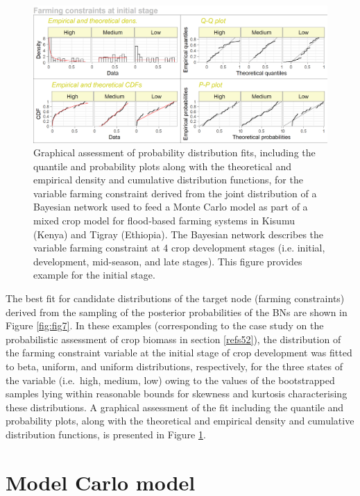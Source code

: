 \documentclass[]{elsarticle} %
\begin{document}
\begin{figure}[!h]

{\centering \includegraphics[width=1\linewidth,]{figures/Local_constraints_at_initial_stage_fitted_distribution} 

}

\caption{Graphical assessment of probability distribution fits, including the quantile and probability plots along with the theoretical and empirical density and cumulative distribution functions, for the variable farming constraint derived from the joint distribution of a Bayesian network used to feed a Monte Carlo model as part of a mixed crop model for flood-based farming systems in Kisumu (Kenya) and Tigray (Ethiopia). The Bayesian network describes the variable farming constraint at 4 crop development stages (i.e. initial, development, mid-season, and late stages). This figure provides example for the initial stage.}\label{fig:fig8}
\end{figure}

The best fit for candidate distributions of the target node (farming constraints) derived from the sampling of the posterior probabilities of the BNs are shown in Figure \ref{fig:fig7}. In these examples (corresponding to the case study on the probabilistic assessment of crop biomass in section \ref{refs52}), the distribution of the farming constraint variable at the initial stage of crop development was fitted to beta, uniform, and uniform distributions, respectively, for the three states of the variable (i.e.~high, medium, low) owing to the values of the bootstrapped samples lying within reasonable bounds for skewness and kurtosis characterising these distributions. A graphical assessment of the fit including the quantile and probability plots, along with the theoretical and empirical density and cumulative distribution functions, is presented in Figure \ref{fig:fig8}.

\hypertarget{refs4}{%
\section{Model Carlo model}\label{refs4}}
\end{document}
